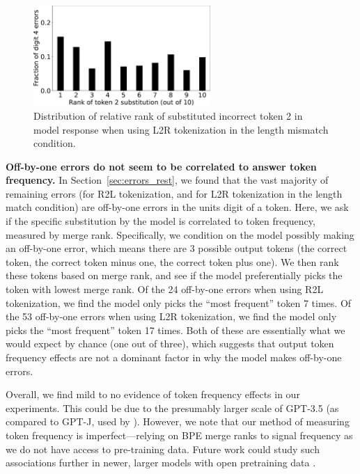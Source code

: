 \documentclass{article}
\theoremstyle{plain}
\theoremstyle{definition}
\theoremstyle{remark}
\begin{document}
\begin{figure}
    \centering
    \includegraphics[width=0.6\textwidth]{figures/len_mismatch_token2_substitution_rank.pdf}
    \caption{Distribution of relative rank of substituted incorrect token 2 in model response when using L2R tokenization in the length mismatch condition.}
    \label{fig:digit4_tok_freq}
\end{figure}

\textbf{Off-by-one errors do not seem to be correlated to answer token frequency.} In Section~\ref{sec:errors_rest}, we found that the vast majority of remaining errors (for R2L tokenization, and for L2R tokenization in the length match condition) are off-by-one errors in the units digit of a token. Here, we ask if the specific substitution by the model is correlated to token frequency, measured by merge rank. Specifically, we condition on the model possibly making an off-by-one error, which means there are 3 possible output tokens (the correct token, the correct token minus one, the correct token plus one). We then rank these tokens based on merge rank, and see if the model preferentially picks the token with lowest merge rank. Of the 24 off-by-one errors when using R2L tokenization, we find the model only picks the ``most frequent'' token 7 times. Of the 53 off-by-one errors when using L2R tokenization, we find the model only picks the ``most frequent'' token 17 times. Both of these are essentially what we would expect by chance (one out of three), which suggests that output token frequency effects are not a dominant factor in why the model makes off-by-one errors.

Overall, we find mild to no evidence of token frequency effects in our experiments. This could be due to the presumably larger scale of GPT-3.5 (as compared to GPT-J, used by \citet{razeghi2022frequencies}). However, we note that our method of measuring token frequency is imperfect---relying on BPE merge ranks to signal frequency as we do not have access to pre-training data. Future work could study such associations further in newer, larger models with open pretraining data \cite{groeneveld2024olmo}.
\end{document}
